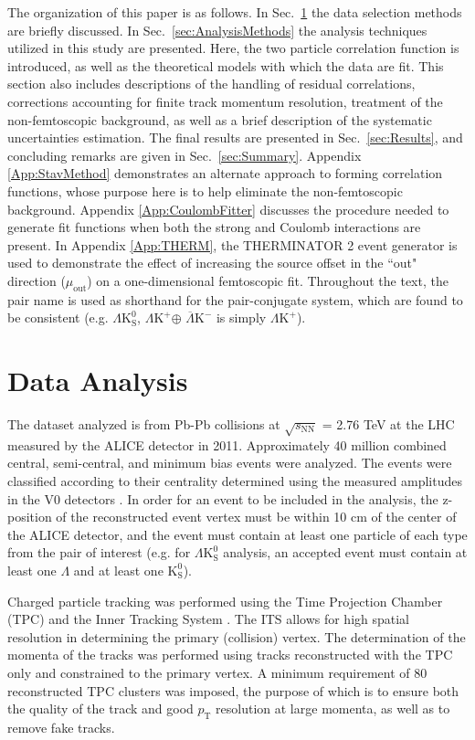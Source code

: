 \documentclass[ALICE,manyauthors]{cernphprep}
\newcommand{\pt}{$p_{\mathrm{T}}$\xspace}
\newcommand{\Lam}{$\Lambda$\xspace}
\newcommand{\Ks}{$\mathrm{K^{0}_{S}}$\xspace}
\newcommand{\LamKchP}{$\Lambda\mathrm{K^{+}}$\xspace}
\newcommand{\ALamKchM}{$\overline{\Lambda}\mathrm{K^{-}}$\xspace}
\newcommand{\LamKs}{$\Lambda\mathrm{K^{0}_{S}}$\xspace}
\begin{document}
The organization of this paper is as follows.  
In Sec.\ \ref{sec:DataAnalysis} the data selection methods are briefly discussed.
In Sec.\ \ref{sec:AnalysisMethods} the analysis techniques utilized in this study are presented.  
Here, the two particle correlation function is introduced, as well as the theoretical models with which the data are fit.  
This section also includes descriptions of the handling of residual correlations, corrections accounting for finite track momentum resolution, treatment of the non-femtoscopic background, as well as a brief description of the systematic uncertainties estimation.  
The final results are presented in Sec.\ \ref{sec:Results}, and concluding remarks are given in Sec.\ \ref{sec:Summary}.
Appendix \ref{App:StavMethod} demonstrates an alternate approach to forming correlation functions, whose purpose here is to help eliminate the non-femtoscopic background.
Appendix \ref{App:CoulombFitter} discusses the procedure needed to generate fit functions when both the strong and Coulomb interactions are present.
In Appendix \ref{App:THERM}, the THERMINATOR 2 event generator is used to demonstrate the effect of increasing the source offset in the ``out" direction ($\mu_{\mathrm{out}}$) on a one-dimensional femtoscopic fit.
Throughout the text, the pair name is used as shorthand for the pair-conjugate system, which are found to be consistent (e.g. \LamKs, \LamKchP $\oplus$ \ALamKchM is simply \LamKchP).

\section{Data Analysis}
\label{sec:DataAnalysis}

The dataset analyzed is from Pb-Pb collisions at $\sqrt{s_{\mathrm{NN}}}$ = 2.76 TeV at the LHC measured by the ALICE detector \cite{1748-0221-3-08-S08002} in 2011.
Approximately 40 million combined central, semi-central, and minimum bias events were analyzed.
The events were classified according to their centrality determined using the measured amplitudes in the V0 detectors \cite{Abelev:2013qoq}.  
In order for an event to be included in the analysis, the z-position of the reconstructed event vertex must be within 10 cm of the center of the ALICE detector, and the event must contain at least one particle of each type from the pair of interest (e.g. for \LamKs analysis, an accepted event must contain at least one \Lam and at least one \Ks). 

Charged particle tracking was performed using the Time Projection Chamber (TPC) \cite{2010NIMPA.622..316A} and the Inner Tracking System \cite{0954-3899-41-8-087002}.  
The ITS allows for high spatial resolution in determining the primary (collision) vertex.
The determination of the momenta of the tracks was performed using tracks reconstructed with the TPC only and constrained to the primary vertex.
A minimum requirement of 80 reconstructed TPC clusters was imposed, the purpose of which is to ensure both the quality of the track and good \pt resolution at large momenta, as well as to remove fake tracks.
\end{document}
